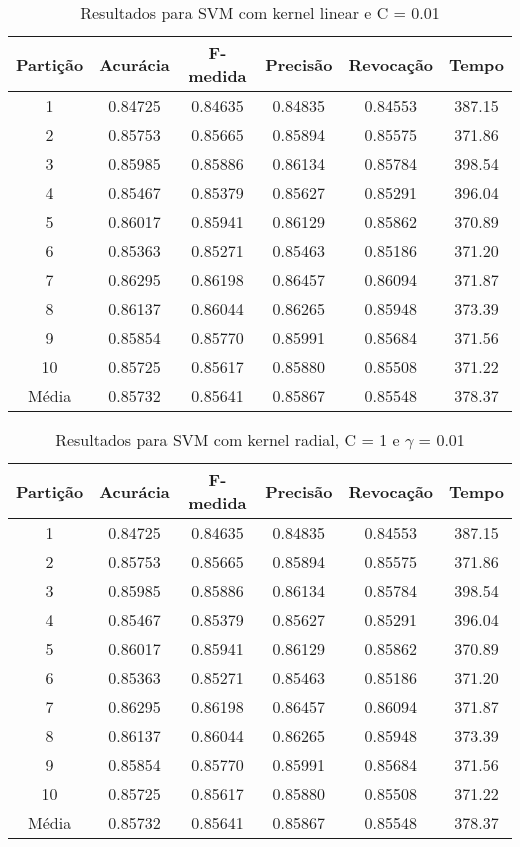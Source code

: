 \begin{table}[h]
\centering
\caption{Resultados para SVM com kernel linear e C = 0.01}
\vspace{0.2cm}
\begin{tabular}{c|c|c|c|c|c}
Partição & Acurácia & F-medida & Precisão & Revocação & Tempo \\
\hline
1  & 0.84725 & 0.84635 & 0.84835 & 0.84553 & 387.15 \\ 
2  & 0.85753 & 0.85665 & 0.85894 & 0.85575 & 371.86 \\
3  & 0.85985 & 0.85886 & 0.86134 & 0.85784 & 398.54 \\
4  & 0.85467 & 0.85379 & 0.85627 & 0.85291 & 396.04 \\
5  & 0.86017 & 0.85941 & 0.86129 & 0.85862 & 370.89 \\
6  & 0.85363 & 0.85271 & 0.85463 & 0.85186 & 371.20 \\
7  & 0.86295 & 0.86198 & 0.86457 & 0.86094 & 371.87 \\
8  & 0.86137 & 0.86044 & 0.86265 & 0.85948 & 373.39 \\
9  & 0.85854 & 0.85770 & 0.85991 & 0.85684 & 371.56 \\
10 & 0.85725 & 0.85617 & 0.85880 & 0.85508 & 371.22 \\
\hline
Média & 0.85732 & 0.85641 & 0.85867 & 0.85548 & 378.37 \\

\end{tabular} 
\label{table:resultadosSVMLinear}
\end{table}

\begin{table}[h]
\centering
\caption{Resultados para SVM com kernel radial, C = 1 e \(\gamma\) = 0.01}
\vspace{0.2cm}
\begin{tabular}{c|c|c|c|c|c}
Partição & Acurácia & F-medida & Precisão & Revocação & Tempo \\
\hline
1  & 0.84725 & 0.84635 & 0.84835 & 0.84553 & 387.15 \\ 
2  & 0.85753 & 0.85665 & 0.85894 & 0.85575 & 371.86 \\
3  & 0.85985 & 0.85886 & 0.86134 & 0.85784 & 398.54 \\
4  & 0.85467 & 0.85379 & 0.85627 & 0.85291 & 396.04 \\
5  & 0.86017 & 0.85941 & 0.86129 & 0.85862 & 370.89 \\
6  & 0.85363 & 0.85271 & 0.85463 & 0.85186 & 371.20 \\
7  & 0.86295 & 0.86198 & 0.86457 & 0.86094 & 371.87 \\
8  & 0.86137 & 0.86044 & 0.86265 & 0.85948 & 373.39 \\
9  & 0.85854 & 0.85770 & 0.85991 & 0.85684 & 371.56 \\
10 & 0.85725 & 0.85617 & 0.85880 & 0.85508 & 371.22 \\
\hline
Média & 0.85732 & 0.85641 & 0.85867 & 0.85548 & 378.37 \\

\end{tabular} 
\label{table:resultadosSVMRadial}
\end{table}

